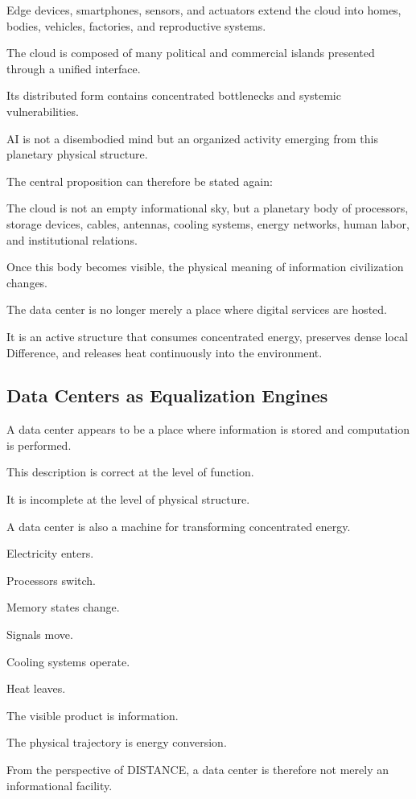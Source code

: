 Edge devices, smartphones, sensors, and actuators extend the cloud into homes, bodies, vehicles, factories, and reproductive systems.

The cloud is composed of many political and commercial islands presented through a unified interface.

Its distributed form contains concentrated bottlenecks and systemic vulnerabilities.

AI is not a disembodied mind but an organized activity emerging from this planetary physical structure.

The central proposition can therefore be stated again:

The cloud is not an empty informational sky, but a planetary body of processors, storage devices, cables, antennas, cooling systems, energy networks, human labor, and institutional relations.

Once this body becomes visible, the physical meaning of information civilization changes.

The data center is no longer merely a place where digital services are hosted.

It is an active structure that consumes concentrated energy, preserves dense local Difference, and releases heat continuously into the environment.

\subsection*{\textbf{Data Centers as Equalization Engines}} 

A data center appears to be a place where information is stored and computation is performed.

This description is correct at the level of function.

It is incomplete at the level of physical structure.

A data center is also a machine for transforming concentrated energy.

Electricity enters.

Processors switch.

Memory states change.

Signals move.

Cooling systems operate.

Heat leaves.

The visible product is information.

The physical trajectory is energy conversion.

From the perspective of DISTANCE, a data center is therefore not merely an informational facility.

